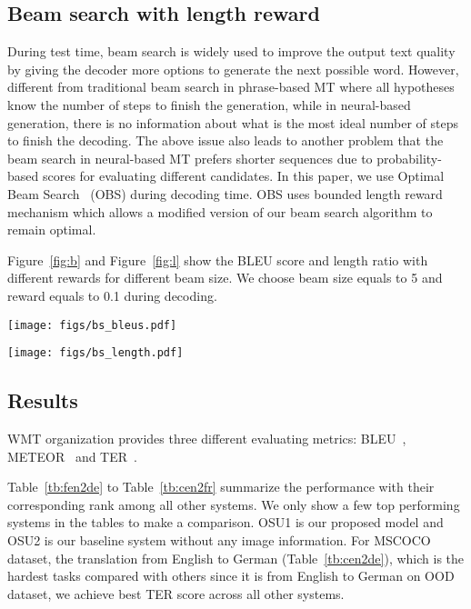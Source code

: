 \subsection{Beam search with length reward}

During test time, beam search is widely used to improve the output text quality by giving the decoder 
more options to generate the next possible word.
However, different from traditional beam search in phrase-based MT where all hypotheses 
know the number of steps to finish the generation, while in neural-based generation, 
there is no information about what is the most ideal number of steps to finish the decoding.
The above issue also leads to another problem that the beam search in neural-based MT prefers shorter sequences due to probability-based scores for evaluating different candidates.
In this paper, we use Optimal Beam Search~\cite{huang+:2017} (OBS) during decoding time.
OBS uses bounded length reward
mechanism which allows a modified version of
our beam search algorithm to remain optimal.

Figure~\ref{fig:b} and Figure~\ref{fig:l} show the BLEU score and length ratio with different rewards for different beam size. We choose beam size equals to 5 and reward equals to 0.1 during decoding. 

\begin{figure*}
\centering
\begin{minipage}{0.5\textwidth}
  \centering
  \texttt{[image: figs/bs\_bleus.pdf]}
  \label{fig:b}
\end{minipage}%
\begin{minipage}{.5\textwidth}
  \centering
  \texttt{[image: figs/bs\_length.pdf]}
  \label{fig:l}
\end{minipage}
\end{figure*}

\subsection{Results}

WMT organization provides three different evaluating metrics: BLEU~\cite{Papineni:2002}, METEOR~\cite{Lavie2009} and TER~\cite{Snover06astudy}. 

Table~\ref{tb:fen2de} to Table~\ref{tb:cen2fr} summarize the performance with their corresponding rank among all other systems. 
We only 
show a few top performing systems in the tables to make a comparison. OSU1 is our proposed model and OSU2 
is our baseline system without any image information. 
For MSCOCO dataset, the translation from English to 
German (Table~\ref{tb:cen2de}), which is the hardest tasks compared with others since it is from 
English to German on OOD dataset, we 
achieve best TER score across all other systems. 



